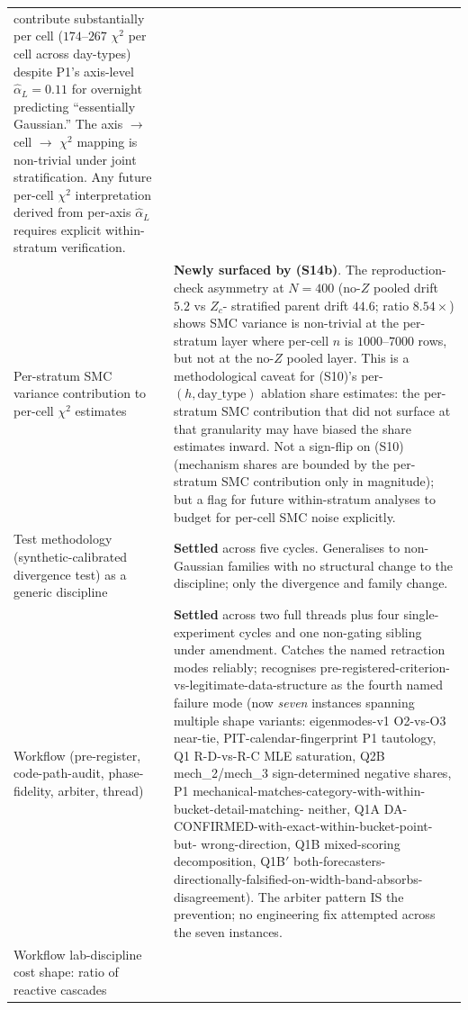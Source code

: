 \documentclass[11pt]{article}
\theoremstyle{definition}
\theoremstyle{plain}
\begin{document}
\begin{longtable}{P{0.40\textwidth}P{0.55\textwidth}}
contribute substantially per cell ($174$--$267$ $\chi^2$ per cell
across day-types) despite P1's axis-level $\hat\alpha_L = 0.11$
for overnight predicting ``essentially Gaussian.'' The axis
$\to$ cell $\to$ $\chi^2$ mapping is non-trivial under joint
stratification. Any future per-cell $\chi^2$ interpretation
derived from per-axis $\hat\alpha_L$ requires explicit
within-stratum verification. \\
\addlinespace
Per-stratum SMC variance contribution to per-cell $\chi^2$
estimates
& \textbf{Newly surfaced by (S14b)}. The reproduction-check
asymmetry at $N = 400$ (no-$Z$ pooled drift $5.2$ vs $Z_c$-
stratified parent drift $44.6$; ratio $8.54\times$) shows SMC
variance is non-trivial at the per-stratum layer where per-cell
$n$ is $1000$--$7000$ rows, but not at the no-$Z$ pooled layer.
This is a methodological caveat for (S10)'s per-$(h,
\mathrm{day\_type})$ ablation share estimates: the per-stratum
SMC contribution that did not surface at that granularity may
have biased the share estimates inward. Not a sign-flip on
(S10) (mechanism shares are bounded by the per-stratum SMC
contribution only in magnitude); but a flag for future
within-stratum analyses to budget for per-cell SMC noise
explicitly. \\
\addlinespace
Test methodology (synthetic-calibrated divergence test) as a
generic discipline
& \textbf{Settled} across five cycles. Generalises to non-Gaussian
families with no structural change to the discipline; only the
divergence and family change. \\
\addlinespace
Workflow (pre-register, code-path-audit, phase-fidelity, arbiter, thread)
& \textbf{Settled} across two full threads plus four single-
experiment cycles and one non-gating sibling under amendment.
Catches the named retraction modes reliably; recognises
pre-registered-criterion-vs-legitimate-data-structure as the
fourth named failure mode (now \emph{seven} instances spanning
multiple shape variants: eigenmodes-v1 O2-vs-O3 near-tie,
PIT-calendar-fingerprint P1 tautology, Q1 R-D-vs-R-C MLE
saturation, Q2B mech\_2/mech\_3 sign-determined negative shares,
P1 mechanical-matches-category-with-within-bucket-detail-matching-
neither, Q1A DA-CONFIRMED-with-exact-within-bucket-point-but-
wrong-direction, Q1B mixed-scoring decomposition, Q1B$'$
both-forecasters-directionally-falsified-on-width-band-absorbs-
disagreement). The arbiter pattern IS the prevention; no
engineering fix attempted across the seven instances. \\
\addlinespace
Workflow lab-discipline cost shape: ratio of reactive cascades

\end{longtable}
\end{document}
